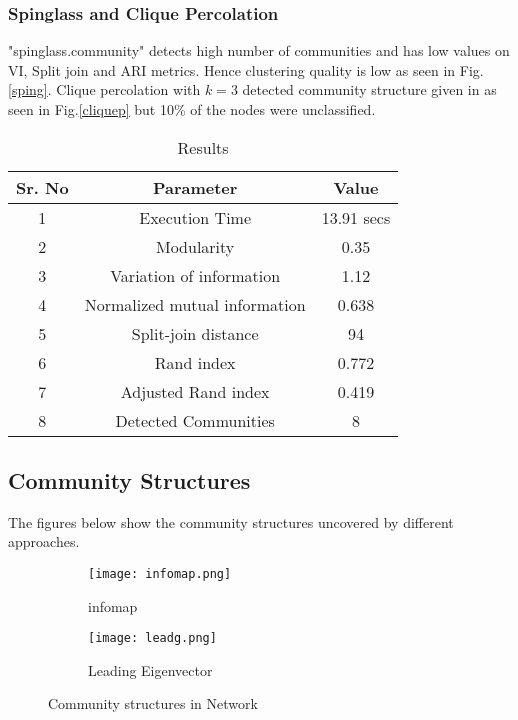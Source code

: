 \subsubsection{Spinglass and Clique Percolation}
"spinglass.community" detects high number of communities and has low values on VI, Split join and ARI metrics. Hence clustering quality is low as seen in Fig.\ref{sping}. Clique percolation with $k=3$ detected community structure given in as seen in Fig.\ref{cliquep} but 10\% of the nodes were unclassified.

\begin{table}[H]
\renewcommand{\arraystretch}{1.3}
\caption{Results}
\label{table}
\centering
\begin{tabular}{|c|c|c|}
  \hline
\multicolumn{1}{|c|}{\textbf{Sr. No}} & \multicolumn{1}{c|}{\textbf{Parameter}} & \multicolumn{1}{c|}{\textbf{Value}} \\
  \hline
  1 & Execution Time &  13.91 secs \\
   \hline
  2 & Modularity &  0.35 \\
   \hline
  3 & Variation of information &  1.12 \\
   \hline
  4 & Normalized mutual information &  0.638 \\
   \hline
  5 & Split-join distance &  94 \\
   \hline
  6 & Rand index &  0.772 \\
   \hline
  7 & Adjusted Rand index &  0.419 \\
  \hline
   8 & Detected Communities &  8 \\
  \hline
\end{tabular}
\end{table}

\subsection{Community Structures}
The figures below show the community structures uncovered by different approaches.

\begin{figure}[H]
  \begin{subfigure}[b]{0.3\linewidth}
    \texttt{[image: infomap.png]}
    \caption{infomap}
    \label{InfoMap}
  \end{subfigure}
  \hfill %
  \begin{subfigure}[b]{0.3\linewidth}
    \texttt{[image: leadg.png]}
    \caption{Leading Eigenvector}
    \label{leadg}
  \end{subfigure}
\caption{Community structures in Network}
\end{figure}


